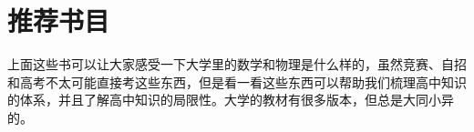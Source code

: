 \chapter{推荐书目}
\nocite{lz2004gdsx}
\nocite{riley2006mathematical}
\nocite{wcs1999sxwlff}
\nocite{zlq2006sxfx}
\nocite{wl2014sfxzdfl}
\nocite{gelbaum2003counterexamples}
\nocite{nahin2014inside}
\nocite{mahajan2010street}
\nocite{qws2010gdds}
\nocite{von2013modern}
\nocite{krauth2006statistical}
\nocite{ld2007lx}
\nocite{shc2006jdlx}
\nocite{gsh2008ddlx}
\nocite{ld2012cl}
\nocite{cbq2001dcxztyj}
\nocite{wzc2008rlxtjwl}
\nocite{shc2011tjlx}
\nocite{griffiths2004introduction}
\nocite{sakurai2011modern}
\nocite{zkh1991dxhbdlwlx}
\nocite{zwiebach2004first}
\nocite{horowitz1980art}
\nocite{lyq2001jglxjc}
\renewcommand{\bibname}{}
\patchcmd{\thebibliography}{\chapter*}{}{}{}



上面这些书可以让大家感受一下大学里的数学和物理是什么样的，虽然竞赛、自招和高考不太可能直接考这些东西，但是看一看这些东西可以帮助我们梳理高中知识的体系，并且了解高中知识的局限性。大学的教材有很多版本，但总是大同小异的。
